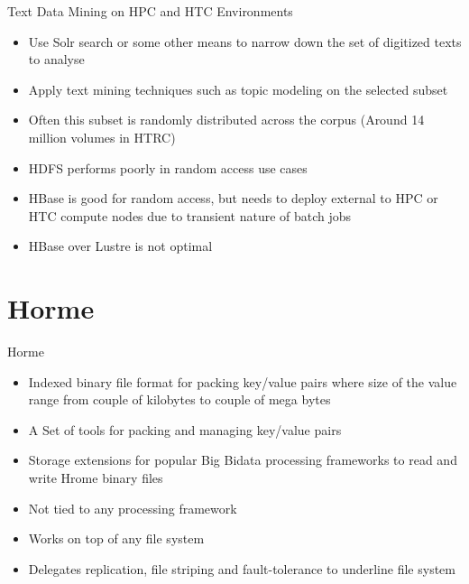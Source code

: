 \documentclass[newPxFont]{beamer}
\begin{document}
\begin{frame}[c]{Text Data Mining on HPC and HTC Environments}
  \begin{itemize}
    \item Use Solr search or some other means to narrow down the set of digitized texts to analyse
    \item Apply text mining techniques such as topic modeling on the selected subset
    \item Often this subset is randomly distributed across the corpus (Around 14 million volumes in HTRC)
    \item HDFS performs poorly in random access use cases
    \item HBase is good for random access, but needs to deploy external to HPC or HTC compute nodes due to transient nature of batch jobs
    \item HBase over Lustre is not optimal
  \end{itemize}
\end{frame}

\section{Horme}

\begin{frame}[c]{Horme}
\begin{itemize}
  \item Indexed binary file format for packing key/value pairs where size of the value range from couple of kilobytes to couple of mega bytes
  \item A Set of tools for packing and managing key/value pairs   
  \item Storage extensions for popular Big Bidata processing frameworks to read and write Hrome binary files
  \item Not tied to any processing framework
  \item Works on top of any file system
  \item Delegates replication, file striping and fault-tolerance to underline file system
\end{itemize}
\end{frame}
\end{document}
